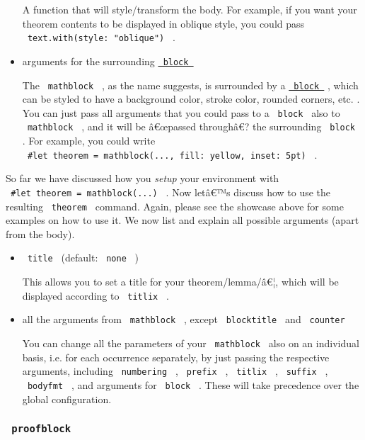 \begin{itemize}
  A function that will style/transform the body. For example, if you
  want your theorem contents to be displayed in oblique style, you could
  pass \texttt{\ text.with(style:\ "oblique")\ } .
\item
  arguments for the surrounding
  \href{https://typst.app/docs/reference/layout/block/}{\texttt{\ block\ }}

  The \texttt{\ mathblock\ } , as the name suggests, is surrounded by a
  \href{https://typst.app/docs/reference/layout/block/}{\texttt{\ block\ }}
  , which can be styled to have a background color, stroke color,
  rounded corners, etc. . You can just pass all arguments that you could
  pass to a \texttt{\ block\ } also to \texttt{\ mathblock\ } , and it
  will be â€œpassed throughâ€? the surrounding \texttt{\ block\ } . For
  example, you could write
  \texttt{\ \#let\ theorem\ =\ mathblock(...,\ fill:\ yellow,\ inset:\ 5pt)\ }
  .
\end{itemize}

So far we have discussed how you \emph{setup} your environment with
\texttt{\ \#let\ theorem\ =\ mathblock(...)\ } . Now letâ€™s discuss how
to use the resulting \texttt{\ theorem\ } command. Again, please see the
showcase above for some examples on how to use it. We now list and
explain all possible arguments (apart from the body).

\begin{itemize}
\item
  \texttt{\ title\ } (default: \texttt{\ none\ } )

  This allows you to set a title for your theorem/lemma/â€¦, which will
  be displayed according to \texttt{\ titlix\ } .
\item
  all the arguments from \texttt{\ mathblock\ } , except
  \texttt{\ blocktitle\ } and \texttt{\ counter\ }

  You can change all the parameters of your \texttt{\ mathblock\ } also
  on an individual basis, i.e. for each occurrence separately, by just
  passing the respective arguments, including \texttt{\ numbering\ } ,
  \texttt{\ prefix\ } , \texttt{\ titlix\ } , \texttt{\ suffix\ } ,
  \texttt{\ bodyfmt\ } , and arguments for \texttt{\ block\ } . These
  will take precedence over the global configuration.
\end{itemize}

\subsubsection{\texorpdfstring{\texttt{\ proofblock\ }}{ proofblock }}\label{proofblock}

